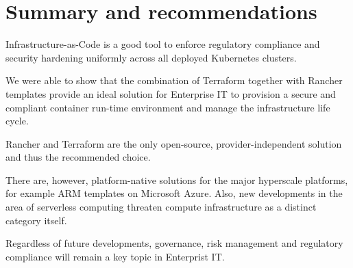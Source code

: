 %
%

\pagebreak
\section{Summary and recommendations}

\onehalfspacing

Infrastructure-as-Code is a good tool to enforce regulatory compliance and security hardening uniformly across all deployed Kubernetes clusters.

We were able to show that the combination of Terraform together with Rancher templates provide an ideal solution for Enterprise IT to provision a secure and compliant container run-time environment and manage the infrastructure life cycle.

Rancher and Terraform are the only open-source, provider-independent
solution and thus the recommended choice.

There are, however, platform-native solutions for the major hyperscale platforms, for example ARM templates on Microsoft Azure. Also, new developments in the area of serverless computing threaten compute infrastructure as a distinct category itself.

Regardless of future developments, governance, risk management and regulatory compliance will remain a key topic in Enterprist IT.